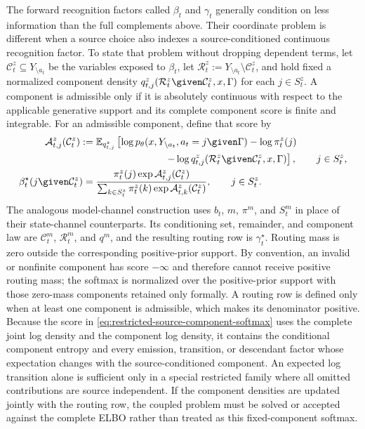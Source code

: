 The forward recognition factors called $\beta_t$ and $\gamma_t$ generally condition on less information than the full complements above. Their coordinate problem is different when a source choice also indexes a source-conditioned continuous recognition factor. To state that problem without dropping dependent terms, let $\mathcal C_t^z\subseteq Y_{\setminus a_t}$ be the variables exposed to $\beta_t$, let $\mathcal R_t^z:=Y_{\setminus a_t}\setminus\mathcal C_t^z$, and hold fixed a normalized component density $q^z_{t,j}(\mathcal R_t^z\given\mathcal C_t^z,x,\Gamma)$ for each $j\in S_t^z$. A component is admissible only if it is absolutely continuous with respect to the applicable generative support and its complete component score is finite and integrable. For an admissible component, define that score by
\begin{equation}
\begin{aligned}
\mathcal A^z_{t,j}(\mathcal C_t^z)
:={}&\mathbb E_{q^z_{t,j}}
\left[
\log p_\theta
(x,Y_{\setminus a_t},a_t=j\given\Gamma)
-\log\pi_t^z(j)
\right.\\
&\left.\hspace{7em}
-\log q^z_{t,j}
(\mathcal R_t^z\given\mathcal C_t^z,x,\Gamma)
\right],
\qquad j\in S_t^z,\\
\beta_t^\star(j\given\mathcal C_t^z)
={}&
\frac{
\pi_t^z(j)\exp\mathcal A^z_{t,j}(\mathcal C_t^z)
}{
\sum_{k\in S_t^z}
\pi_t^z(k)\exp\mathcal A^z_{t,k}(\mathcal C_t^z)
},
\qquad j\in S_t^z.
\end{aligned}
\label{eq:restricted-source-component-softmax}
\end{equation}
The analogous model-channel construction uses $b_t$, $m$, $\pi^m$, and $S_t^m$ in place of their state-channel counterparts. Its conditioning set, remainder, and component law are $\mathcal C_t^m$, $\mathcal R_t^m$, and $q^m$, and the resulting routing row is $\gamma_t^\star$. Routing mass is zero outside the corresponding positive-prior support. By convention, an invalid or nonfinite component has score $-\infty$ and therefore cannot receive positive routing mass; the softmax is normalized over the positive-prior support with those zero-mass components retained only formally. A routing row is defined only when at least one component is admissible, which makes its denominator positive. Because the score in \cref{eq:restricted-source-component-softmax} uses the complete joint log density and the component log density, it contains the conditional component entropy and every emission, transition, or descendant factor whose expectation changes with the source-conditioned component. An expected log transition alone is sufficient only in a special restricted family where all omitted contributions are source independent. If the component densities are updated jointly with the routing row, the coupled problem must be solved or accepted against the complete ELBO rather than treated as this fixed-component softmax.

